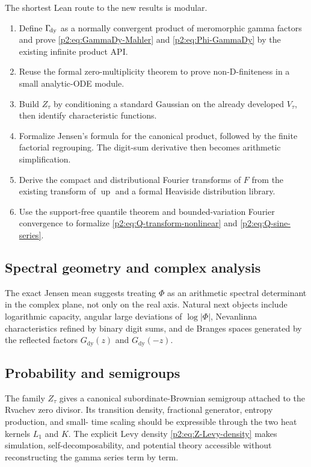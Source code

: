 \documentclass[11pt]{article}
\theoremstyle{definition}
\theoremstyle{remark}
\newcommand{\Up}{\operatorname{up}}
\begin{document}
The shortest Lean route to the new results is modular.
\begin{enumerate}[leftmargin=2.3em]
\item Define $\Gamma_{\!\mathrm{dy}}$ as a normally convergent product of meromorphic gamma factors and
      prove \eqref{p2:eq:GammaDy-Mahler} and \eqref{p2:eq:Phi-GammaDy} by the existing infinite
      product API.
\item Reuse the formal zero-multiplicity theorem to prove non-D-finiteness in a small
      analytic-ODE module.
\item Build $Z_\tau$ by conditioning a standard Gaussian on the already developed
      $V_\tau$, then identify characteristic functions.
\item Formalize Jensen's formula for the canonical product, followed by the finite factorial
      regrouping.  The digit-sum derivative then becomes arithmetic simplification.
\item Derive the compact and distributional Fourier transforms of $F$ from the existing
      transform of $\Up$ and a formal Heaviside distribution library.
\item Use the support-free quantile theorem and bounded-variation Fourier convergence to
      formalize \eqref{p2:eq:Q-transform-nonlinear} and \eqref{p2:eq:Q-sine-series}.
\end{enumerate}

\subsection{Spectral geometry and complex analysis}

The exact Jensen mean suggests treating $\Phi$ as an arithmetic spectral determinant in the
complex plane, not only on the real axis.  Natural next objects include logarithmic capacity,
angular large deviations of $\log|\Phi|$, Nevanlinna characteristics refined by binary digit
sums, and de Branges spaces generated by the reflected factors
$G_{\mathrm{dy}}(z)$ and $G_{\mathrm{dy}}(-z)$.

\subsection{Probability and semigroups}

The family $Z_\tau$ gives a canonical subordinate-Brownian semigroup attached to the Rvachev
zero divisor.  Its transition density, fractional generator, entropy production, and small-
time scaling should be expressible through the two heat kernels $L_1$ and $K$.  The explicit
Levy density \eqref{p2:eq:Z-Levy-density} makes simulation, self-decomposability, and potential
theory accessible without reconstructing the gamma series term by term.
\end{document}
